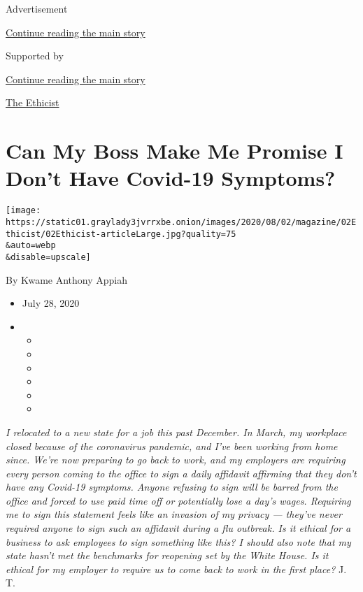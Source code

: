 Advertisement

\protect\hyperlink{after-top}{Continue reading the main story}

Supported by

\protect\hyperlink{after-sponsor}{Continue reading the main story}

\href{/column/the-ethicist}{The Ethicist}

\hypertarget{can-my-boss-make-me-promise-i-dont-have-covid-19-symptoms}{%
\section{Can My Boss Make Me Promise I Don't Have Covid-19
Symptoms?}\label{can-my-boss-make-me-promise-i-dont-have-covid-19-symptoms}}

\texttt{[image: https://static01.graylady3jvrrxbe.onion/images/2020/08/02/magazine/02Ethicist/02Ethicist-articleLarge.jpg?quality=75\\\&auto=webp\\\&disable=upscale]}

By Kwame Anthony Appiah

\begin{itemize}
\item
  July 28, 2020
\item
  \begin{itemize}
  \item
  \item
  \item
  \item
  \item
  \item
  \end{itemize}
\end{itemize}

\emph{I relocated to a new state for a job this past December. In March,
my workplace closed because of the coronavirus pandemic, and I've been
working from home since. We're now preparing to go back to work, and my
employers are requiring every person coming to the office to sign a
daily affidavit affirming that they don't have any Covid-19 symptoms.
Anyone refusing to sign will be barred from the office and forced to use
paid time off or potentially lose a day's wages. Requiring me to sign
this statement feels like an invasion of my privacy --- they've never
required anyone to sign such an affidavit during a flu outbreak. Is it
ethical for a business to ask employees to sign something like this? I
should also note that my state hasn't met the benchmarks for reopening
set by the White House. Is it ethical for my employer to require us to
come back to work in the first place?} J. T.

